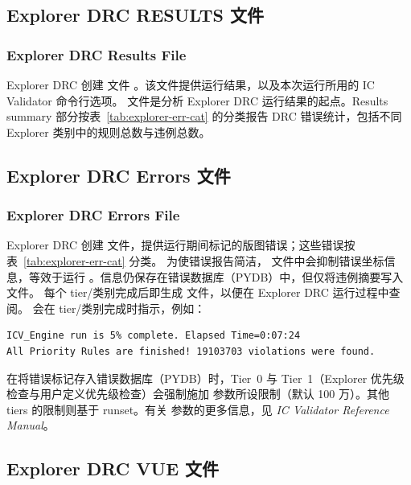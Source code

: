 \subsection{Explorer DRC RESULTS 文件}
\subsubsection*{Explorer DRC Results File}

Explorer DRC 创建  文件 。该文件提供运行结果，以及本次运行所用的 IC Validator 命令行选项。
 文件是分析 Explorer DRC 运行结果的起点。Results summary 部分按表~\ref{tab:explorer-err-cat} 的分类报告 DRC 错误统计，包括不同 Explorer 类别中的规则总数与违例总数。

\subsection{Explorer DRC Errors 文件}
\subsubsection*{Explorer DRC Errors File}

Explorer DRC 创建  文件，提供运行期间标记的版图错误；这些错误按表~\ref{tab:explorer-err-cat} 分类。
为使错误报告简洁， 文件中会抑制错误坐标信息，等效于运行 。信息仍保存在错误数据库（PYDB）中，但仅将违例摘要写入  文件。
每个 tier/类别完成后即生成  文件，以便在 Explorer DRC 运行过程中查阅。 会在 tier/类别完成时指示，例如：
\begin{lstlisting}
ICV_Engine run is 5% complete. Elapsed Time=0:07:24
All Priority Rules are finished! 19103703 violations were found.
\end{lstlisting}

\begin{noteBox}
在将错误标记存入错误数据库（PYDB）时，Tier~0 与 Tier~1（Explorer 优先级检查与用户定义优先级检查）会强制施加  参数所设限制（默认 100 万）。其他 tiers 的限制则基于 runset。有关  参数的更多信息，见 \textit{IC Validator Reference Manual}。
\end{noteBox}

\subsection{Explorer DRC VUE 文件}
